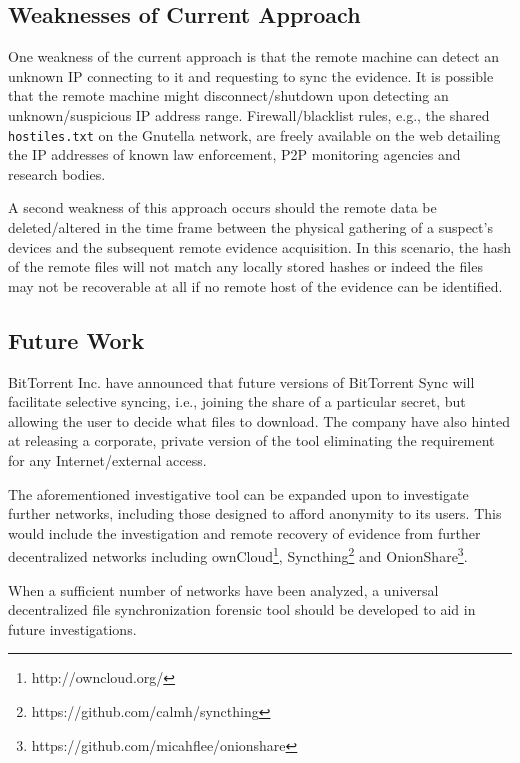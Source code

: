 \documentclass{jdfsl}
\begin{document}
\subsection{Weaknesses of Current Approach}
\label{weaknesses}
One weakness of the current approach is that the remote machine can detect an unknown IP connecting to it and requesting to sync the evidence. It is possible that the remote machine might disconnect/shutdown upon detecting an unknown/suspicious IP address range. Firewall/blacklist rules, e.g., the shared \texttt{hostiles.txt} on the Gnutella network, are freely available on the web detailing the IP addresses of known law enforcement, P2P monitoring agencies and research bodies.

A second weakness of this approach occurs should the remote data be deleted/altered in the time frame between the physical gathering of a suspect's devices and the subsequent remote evidence acquisition. In this scenario, the hash of the remote files will not match any locally stored hashes or indeed the files may not be recoverable at all if no remote host of the evidence can be identified.\\

\subsection{Future Work}
\label{futurework}

BitTorrent Inc. have announced that future versions of BitTorrent Sync will facilitate selective syncing, i.e., joining the share of a particular secret, but allowing the user to decide what files to download. The company have also hinted at releasing a corporate, private version of the tool eliminating the requirement for any Internet/external access. 

The aforementioned investigative tool can be expanded upon to investigate further networks, including those designed to afford anonymity to its users. This would include the investigation and remote recovery of evidence from further decentralized networks including ownCloud\footnote{http://owncloud.org/}, Syncthing\footnote{https://github.com/calmh/syncthing} and OnionShare\footnote{https://github.com/micahflee/onionshare}. 

When a sufficient number of networks have been analyzed, a universal decentralized file synchronization forensic tool should be developed to aid in future investigations.


\newpage


\begin{flushleft}

\end{flushleft}
\end{document}
